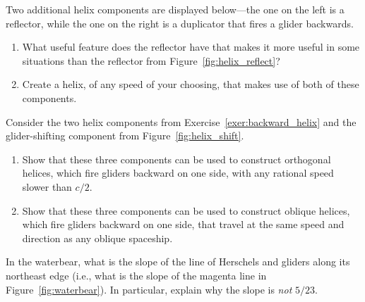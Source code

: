 \begin{multicols}{2}
\mfilbreak


\begin{problem}\label{exer:backward_helix}
	Two additional helix components are displayed below---the one on the left is a reflector, while the one on the right is a duplicator that fires a glider backwards.
	
	\noindent\begin{center}
	\end{center}
	
	\begin{enumerate}[label=\bf\color{ocre}(\alph*)]
		\item What useful feature does the reflector have that makes it more useful in some situations than the reflector from Figure~\ref{fig:helix_reflect}?
		
		\item Create a helix, of any speed of your choosing, that makes use of both of these components.
	\end{enumerate}
\end{problem}


\mfilbreak


\begin{problem}\label{exer:backward_helix_universal}
	Consider the two helix components from Exercise~\ref{exer:backward_helix} and the glider-shifting component from Figure~\ref{fig:helix_shift}.\smallskip
	
	\begin{enumerate}[label=\bf\color{ocre}(\alph*)]
		\item Show that these three components can be used to construct orthogonal helices, which fire gliders backward on one side, with any rational speed slower than $c/2$.
		
		\item Show that these three components can be used to construct oblique helices, which fire gliders backward on one side, that travel at the same speed and direction as any oblique spaceship.
	\end{enumerate}
\end{problem}


\mfilbreak


\begin{problemstar}\label{exer:waterbear_what_slope}
	In the waterbear, what is the slope of the line of Herschels and gliders along its northeast edge (i.e., what is the slope of the magenta line in Figure~\ref{fig:waterbear}). In particular, explain why the slope is \emph{not} $5/23$.
\end{problemstar}



\end{multicols}
